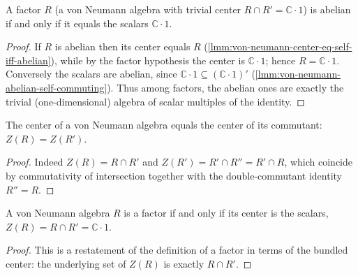 \begin{theorem}
    \label{thrm:factor-abelian-iff-scalars}
    \leanok
    A factor $R$ (a von Neumann algebra with trivial center $R \cap R' = \mathbb{C}\cdot 1$) is abelian if and only if it equals the scalars $\mathbb{C}\cdot 1$.
\end{theorem}
\begin{proof}
    \leanok
    If $R$ is abelian then its center equals $R$ (\ref{lmm:von-neumann-center-eq-self-iff-abelian}), while by the factor hypothesis the center is $\mathbb{C}\cdot 1$; hence $R = \mathbb{C}\cdot 1$. Conversely the scalars are abelian, since $\mathbb{C}\cdot 1 \subseteq (\mathbb{C}\cdot 1)'$ (\ref{lmm:von-neumann-abelian-self-commuting}). Thus among factors, the abelian ones are exactly the trivial (one-dimensional) algebra of scalar multiples of the identity.
\end{proof}

\begin{theorem}
  \label{thrm:center-eq-commutant-center}
  \leanok
  The center of a von Neumann algebra equals the center of its commutant: $Z(R) = Z(R')$.
\end{theorem}
\begin{proof}
  \leanok
  Indeed $Z(R) = R \cap R'$ and $Z(R') = R' \cap R'' = R' \cap R$, which coincide by commutativity of intersection together with the double-commutant identity $R'' = R$.
\end{proof}

\begin{theorem}
  \label{thrm:factor-iff-center-scalars}
  \leanok
  A von Neumann algebra $R$ is a factor if and only if its center is the scalars, $Z(R) = R \cap R' = \mathbb{C}\cdot 1$.
\end{theorem}
\begin{proof}
  \leanok
  This is a restatement of the definition of a factor in terms of the bundled center: the underlying set of $Z(R)$ is exactly $R \cap R'$.
\end{proof}

